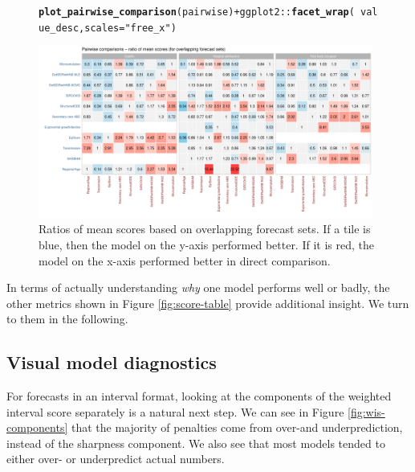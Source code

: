 \documentclass[article,shortnames]{jss}\usepackage[]{graphicx}\usepackage[]{color}
\makeatletter
\newcommand{\hlstr}[1]{\textcolor[rgb]{0.192,0.494,0.8}{#1}}%
\newcommand{\hlopt}[1]{\textcolor[rgb]{0,0,0}{#1}}%
\newcommand{\hlstd}[1]{\textcolor[rgb]{0.345,0.345,0.345}{#1}}%
\newcommand{\hlkwc}[1]{\textcolor[rgb]{0.333,0.667,0.333}{#1}}%
\newcommand{\hlkwd}[1]{\textcolor[rgb]{0.737,0.353,0.396}{\textbf{#1}}}%
\newenvironment{kframe}{%
 \def\at@end@of@kframe{}%
 \ifinner\ifhmode%
  \def\at@end@of@kframe{\end{minipage}}%
  \begin{minipage}{\columnwidth}%
 \fi\fi%
 \def\FrameCommand##1{\hskip\@totalleftmargin \hskip-\fboxsep
 \colorbox{shadecolor}{##1}\hskip-\fboxsep
     \hskip-\linewidth \hskip-\@totalleftmargin \hskip\columnwidth}%
 \MakeFramed {\advance\hsize-\width
   \@totalleftmargin\z@ \linewidth\hsize
   \@setminipage}}%
 {\par\unskip\endMakeFramed%
 \at@end@of@kframe}
\newenvironment{knitrout}{}{} %
\makeatother
\begin{document}
\begin{figure}[h!]
\centering
\begin{knitrout}
\color{fgcolor}\begin{kframe}
\begin{alltt}
\hlkwd{plot_pairwise_comparison}\hlstd{(pairwise)} \hlopt{+} \hlstd{ggplot2}\hlopt{::}\hlkwd{facet_wrap}\hlstd{(}\hlopt{~}\hlstd{value_desc,} \hlkwc{scales} \hlstd{=} \hlstr{"free_x"}\hlstd{)}
\end{alltt}
\end{kframe}
\includegraphics[width=0.98\textwidth]{plots/plot-pairwise-plot-1} 
\end{knitrout}
\caption{\label{fig:pairwise-comparison} Ratios of mean scores based on overlapping forecast sets. If a tile is blue, then the model on the y-axis performed better. If it is red, the model on the x-axis performed better in direct comparison. }
\end{figure}

In terms of actually understanding \textit{why} one model performs well or badly, the other metrics shown in Figure \ref{fig:score-table} provide additional insight. We turn to them in the following. 

\subsection{Visual model diagnostics}

For forecasts in an interval format, looking at the components of the weighted interval score separately is a natural next step. We can see in Figure \ref{fig:wis-components} that the majority of penalties come from over-and underprediction, instead of the sharpness component. We also see that most models tended to either over- or underpredict actual numbers.  
\end{document}
